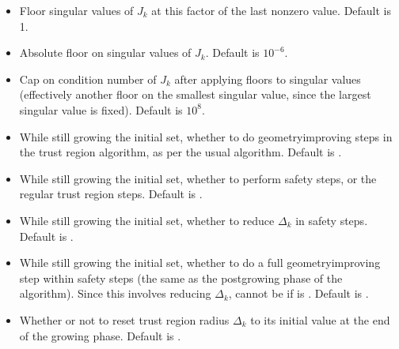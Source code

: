 \documentclass[letterpaper,10pt,english]{sphinxmanual}
\begin{document}
\begin{itemize}
\item {} 
\sphinxAtStartPar
{} \sphinxhyphen{} Floor singular values of \(J_k\) at this factor of the last nonzero value. Default is 1.

\item {} 
\sphinxAtStartPar
{} \sphinxhyphen{} Absolute floor on singular values of \(J_k\). Default is \(10^{-6}\).

\item {} 
\sphinxAtStartPar
{} \sphinxhyphen{} Cap on condition number of \(J_k\) after applying floors to singular values (effectively another floor on the smallest singular value, since the largest singular value is fixed). Default is \(10^8\).

\item {} 
\sphinxAtStartPar
{} \sphinxhyphen{} While still growing the initial set, whether to do geometry\sphinxhyphen{}improving steps in the trust region algorithm, as per the usual algorithm. Default is .

\item {} 
\sphinxAtStartPar
{} \sphinxhyphen{} While still growing the initial set, whether to perform safety steps, or the regular trust region steps. Default is .

\item {} 
\sphinxAtStartPar
{} \sphinxhyphen{} While still growing the initial set, whether to reduce \(\Delta_k\) in safety steps. Default is .

\item {} 
\sphinxAtStartPar
{} \sphinxhyphen{} While still growing the initial set, whether to do a full geometry\sphinxhyphen{}improving step within safety steps (the same as the post\sphinxhyphen{}growing phase of the algorithm). Since this involves reducing \(\Delta_k\), cannot be  if  is . Default is .

\item {} 
\sphinxAtStartPar
{} \sphinxhyphen{} Whether or not to reset trust region radius \(\Delta_k\) to its initial value at the end of the growing phase. Default is .


\end{itemize}
\end{document}
